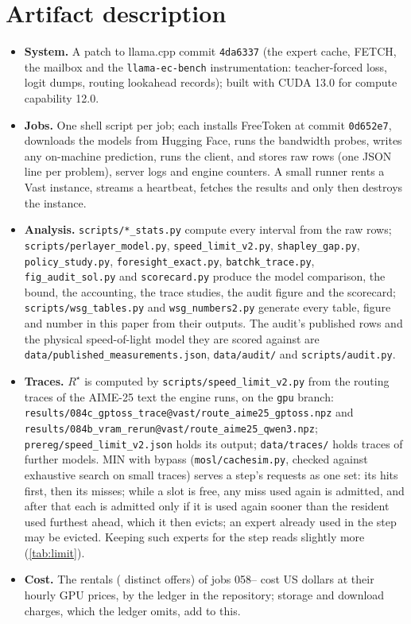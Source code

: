 \section{Artifact description}\label{app:artifact}
\begin{itemize}\setlength\itemsep{1pt}
\item \textbf{System.} A patch to llama.cpp commit \texttt{4da6337} (the expert cache, FETCH, the mailbox and the
\texttt{llama-ec-bench} instrumentation: teacher-forced loss, logit dumps, routing lookahead records); built with CUDA 13.0
for compute capability 12.0.
\item \textbf{Jobs.} One shell script per job; each installs FreeToken at commit \texttt{0d652e7}, downloads the
models from Hugging Face, runs the bandwidth probes, writes any on-machine prediction, runs the client, and stores raw
rows (one JSON line per problem), server logs and engine counters. A small runner rents a Vast instance, streams a
heartbeat, fetches the results and only then destroys the instance.
\item \textbf{Analysis.} \texttt{scripts/*\_stats.py} compute every interval from the raw rows;
\texttt{scripts/perlayer\_model.py}, \texttt{speed\_limit\_v2.py}, \texttt{shapley\_gap.py}, \texttt{policy\_study.py},
\texttt{foresight\_exact.py}, \texttt{batchk\_trace.py}, \texttt{fig\_audit\_sol.py} and \texttt{scorecard.py} produce the
model comparison, the bound, the accounting, the trace studies, the audit figure and the scorecard;
\texttt{scripts/wsg\_tables.py} and \texttt{wsg\_numbers2.py} generate every table, figure and number in this paper from
their outputs. The audit's \audAllN{} published rows and the physical speed-of-light model they are scored against are
\texttt{data/published\_measurements.json}, \texttt{data/audit/} and \texttt{scripts/audit.py}.
\item \textbf{Traces.} $R^\star$ is computed by \texttt{scripts/speed\_limit\_v2.py} from the routing traces of the
AIME-25 text the engine runs, on the \texttt{gpu} branch: \texttt{results/084c\_gptoss\_trace@vast/route\_aime25\_gptoss.npz}
and \texttt{results/084b\_vram\_rerun@vast/route\_aime25\_qwen3.npz}; \texttt{prereg/speed\_limit\_v2.json} holds its
output; \texttt{data/traces/} holds traces of further models. MIN with bypass (\texttt{mosl/cachesim.py}, checked
against exhaustive search on small traces) serves a step's requests as one set: its hits first, then its misses; while a slot is free, any miss
used again is admitted, and after that each is admitted only if it is used again sooner than the resident used furthest ahead, which it then evicts; an expert already used
in the step may be evicted. Keeping such experts for the step reads slightly more (\cref{tab:limit}).
\item \textbf{Cost.} The \costRentals{} rentals (\costMachines{} distinct offers) of jobs 058--\costJobHi{} cost \costUsd{} US dollars at their hourly GPU prices, by the ledger in the repository; storage and download charges, which the ledger omits, add to this.
\end{itemize}
